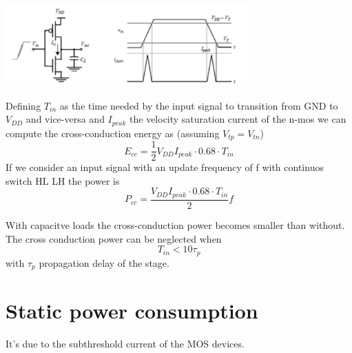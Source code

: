 \centering
\includegraphics[width=0.7\textwidth]{C4_1.png}\\
\raggedright

Defining $T_{in}$ as the time needed by the input signal to transition from GND to $V_{DD}$ and vice-versa and $I_{peak}$ the velocity saturation current of the n-mos we can compute the cross-conduction energy as (assuming $V_{tp}=V_{tn}$) 
\begin{equation}
E_{cc}= \frac{1}{2} V_{DD}I_{peak}\cdot 0.68 \cdot T_{in}
\end{equation}
If we consider an input signal with an update frequency of f with continuos switch HL LH the power is 
\begin{equation}
P_{cc}=\frac{V_{DD}I_{peak} \cdot 0.68 \cdot T_{in}}{2} f
\end{equation}

\vspace{5mm}

With capacitve loads the cross-conduction power becomes smaller than without.\\ 
The cross conduction power can be neglected when 
\begin{equation}
T_{in}<10\tau_p
\end{equation}
with $\tau_p$ propagation delay of the stage.\\


\section{Static power consumption}
It's due to the subthreshold current of the MOS devices.

